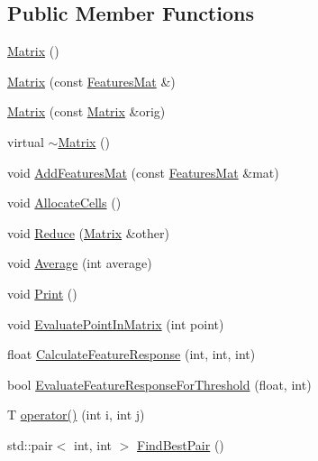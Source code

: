 \subsection*{Public Member Functions}
\begin{DoxyCompactItemize}
\item 
\hyperlink{classrdf_1_1bpc_1_1Matrix_ade45ad0ebe3b9c850608a4f5abb19420}{Matrix} ()
\item 
\hyperlink{classrdf_1_1bpc_1_1Matrix_a2bc9d43380289047df29a49cbbda1067}{Matrix} (const \hyperlink{classrdf_1_1bpc_1_1FeaturesMat}{Features\+Mat} \&)
\item 
\hyperlink{classrdf_1_1bpc_1_1Matrix_a2ec31b288ce0fbdacf2310446f3ace38}{Matrix} (const \hyperlink{classrdf_1_1bpc_1_1Matrix}{Matrix} \&orig)
\item 
virtual \hyperlink{classrdf_1_1bpc_1_1Matrix_ab7cf40ce5404d7727a0a656e8c739140}{$\sim$\+Matrix} ()
\item 
void \hyperlink{classrdf_1_1bpc_1_1Matrix_a937666077b21230acd1afe126f84a7b4}{Add\+Features\+Mat} (const \hyperlink{classrdf_1_1bpc_1_1FeaturesMat}{Features\+Mat} \&mat)
\item 
void \hyperlink{classrdf_1_1bpc_1_1Matrix_ac90210cef7b4b102b3ec19d78a38631d}{Allocate\+Cells} ()
\item 
void \hyperlink{classrdf_1_1bpc_1_1Matrix_a45f64dbd9f56ee67d906aa08961bbae9}{Reduce} (\hyperlink{classrdf_1_1bpc_1_1Matrix}{Matrix} \&other)
\item 
void \hyperlink{classrdf_1_1bpc_1_1Matrix_a480cb47beacfcc5809503893fc38b968}{Average} (int average)
\item 
void \hyperlink{classrdf_1_1bpc_1_1Matrix_acb261eb27775f1ed974349f7ceb6c1c3}{Print} ()
\item 
void \hyperlink{classrdf_1_1bpc_1_1Matrix_a05799bd5cff0c7c1d1c4f6fa19dce22b}{Evaluate\+Point\+In\+Matrix} (int point)
\item 
float \hyperlink{classrdf_1_1bpc_1_1Matrix_a3884af4b2109a2d80b2dc2778bd71a8e}{Calculate\+Feature\+Response} (int, int, int)
\item 
bool \hyperlink{classrdf_1_1bpc_1_1Matrix_a81c5040bdc90a4548ebedc0e3027d666}{Evaluate\+Feature\+Response\+For\+Threshold} (float, int)
\item 
T \hyperlink{classrdf_1_1bpc_1_1Matrix_a950b7d0d97347c41047d8e5631552e58}{operator()} (int i, int j)
\item 
std\+::pair$<$ int, int $>$ \hyperlink{classrdf_1_1bpc_1_1Matrix_ab6cf5e854c06f976908b4f53462b6bd3}{Find\+Best\+Pair} ()
\end{DoxyCompactItemize}
